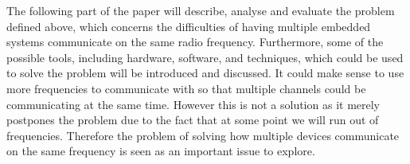 \bigskip \noindent
The following part of the paper will describe, analyse and evaluate the problem defined above, which concerns the difficulties of having multiple embedded systems communicate on the same radio frequency.
Furthermore, some of the possible tools, including hardware, software, and techniques, which could be used to solve the problem will be introduced and discussed.
It could make sense to use more frequencies to communicate with so that multiple channels could be communicating at the same time.
However this is not a solution as it merely postpones the problem due to the fact that at some point we will run out of frequencies. 
Therefore the problem of solving how multiple devices communicate on the same frequency is seen as an important issue to explore.
